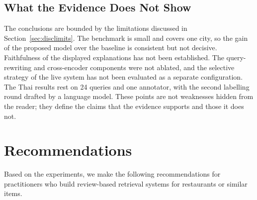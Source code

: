 \subsection{What the Evidence Does Not Show}
\label{sec:notshown}

The conclusions are bounded by the limitations discussed in Section~\ref{sec:disclimits}. The benchmark is small and covers one city, so the gain of the proposed model over the baseline is consistent but not decisive. Faithfulness of the displayed explanations has not been established. The query-rewriting and cross-encoder components were not ablated, and the selective strategy of the live system has not been evaluated as a separate configuration. The Thai results rest on 24 queries and one annotator, with the second labelling round drafted by a language model. These points are not weaknesses hidden from the reader; they define the claims that the evidence supports and those it does not.

\section{Recommendations}
\label{sec:recommendations}

Based on the experiments, we make the following recommendations for practitioners who build review-based retrieval systems for restaurants or similar items.

